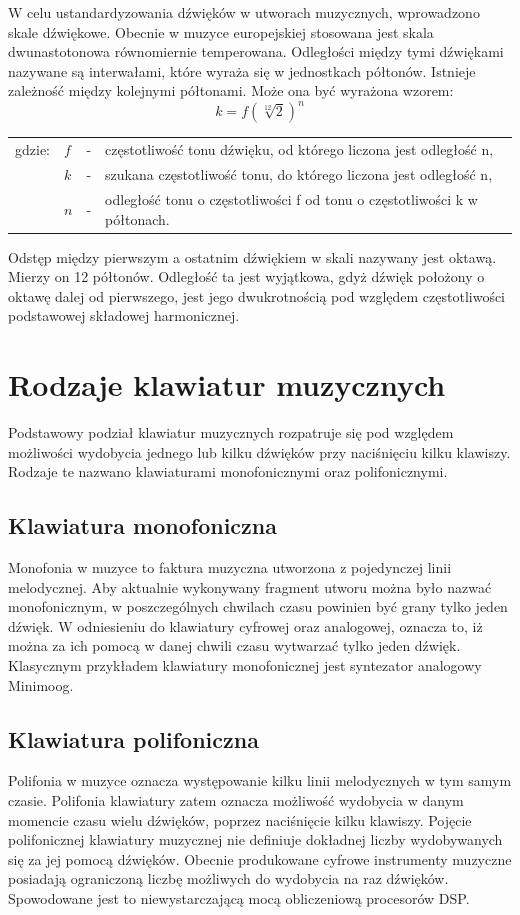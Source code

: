 W celu ustandardyzowania dźwięków w utworach muzycznych, wprowadzono skale dźwiękowe. Obecnie w muzyce europejskiej stosowana jest skala dwunastotonowa równomiernie temperowana. Odległości między tymi dźwiękami nazywane są interwałami, które wyraża się w jednostkach półtonów. Istnieje zależność między kolejnymi półtonami. Może ona być wyrażona wzorem:
\begin{equation} \label{equ:wpr_dzwiek}
k = f(\sqrt[12]{2})^{n}
\end{equation}
\begin{tabular}{ l l l l}
	gdzie: 	&	$f$ & - &  częstotliwość tonu dźwięku, od którego liczona jest odległość n, \\
	&	$k$ & - &  szukana częstotliwość tonu, do którego liczona jest odległość n, \\
	&   $n$ &  - & odległość tonu o częstotliwości f od tonu o częstotliwości k w półtonach. \\
\end{tabular}

Odstęp między pierwszym a ostatnim dźwiękiem w skali nazywany jest oktawą. Mierzy on 12 półtonów. Odległość ta jest wyjątkowa, gdyż dźwięk położony o oktawę dalej od pierwszego, jest jego dwukrotnością pod względem częstotliwości podstawowej składowej harmonicznej.



\section{Rodzaje klawiatur muzycznych}
Podstawowy podział klawiatur muzycznych rozpatruje się pod względem możliwości wydobycia jednego lub kilku dźwięków przy naciśnięciu kilku klawiszy. Rodzaje te nazwano klawiaturami monofonicznymi oraz polifonicznymi.

\subsection{Klawiatura monofoniczna}
Monofonia w muzyce to faktura muzyczna utworzona z pojedynczej linii melodycznej. Aby aktualnie wykonywany fragment utworu można było nazwać monofonicznym, w poszczególnych chwilach czasu powinien być grany tylko jeden dźwięk. W odniesieniu do klawiatury cyfrowej oraz analogowej, oznacza to, iż można za ich pomocą w danej chwili czasu wytwarzać tylko jeden dźwięk. Klasycznym przykładem klawiatury monofonicznej jest syntezator analogowy Minimoog.

\subsection{Klawiatura polifoniczna}
Polifonia w muzyce oznacza występowanie kilku linii melodycznych w tym samym czasie. Polifonia klawiatury zatem oznacza możliwość wydobycia w danym momencie czasu wielu dźwięków, poprzez naciśnięcie kilku klawiszy. Pojęcie polifonicznej klawiatury muzycznej nie definiuje dokładnej liczby wydobywanych się za jej pomocą dźwięków. Obecnie produkowane cyfrowe instrumenty muzyczne posiadają ograniczoną liczbę możliwych do wydobycia na raz dźwięków. Spowodowane jest to niewystarczającą mocą obliczeniową procesorów DSP.

